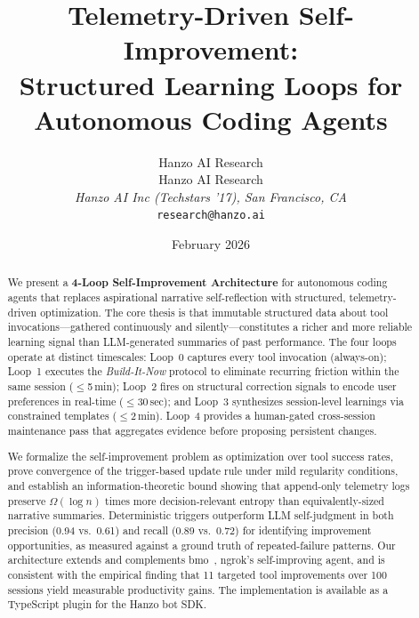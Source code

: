 \documentclass[11pt]{article}
\title{Telemetry-Driven Self-Improvement:\\
Structured Learning Loops for Autonomous Coding Agents}
\author{
    Hanzo AI Research \\
    Hanzo AI Research\\
    \textit{Hanzo AI Inc (Techstars '17), San Francisco, CA}\\
    \texttt{research@hanzo.ai}
}
\date{February 2026}
\begin{document}
\hanzocoverpage

\begin{abstract}
We present a \textbf{4-Loop Self-Improvement Architecture} for autonomous coding
agents that replaces aspirational narrative self-reflection with structured,
telemetry-driven optimization. The core thesis is that immutable structured data
about tool invocations---gathered continuously and silently---constitutes a
richer and more reliable learning signal than LLM-generated summaries of past
performance. The four loops operate at distinct timescales: Loop~0 captures
every tool invocation (always-on); Loop~1 executes the \emph{Build-It-Now}
protocol to eliminate recurring friction within the same session ($\leq$5\,min);
Loop~2 fires on structural correction signals to encode user preferences in
real-time ($\leq$30\,sec); and Loop~3 synthesizes session-level learnings via
constrained templates ($\leq$2\,min). Loop~4 provides a human-gated
cross-session maintenance pass that aggregates evidence before proposing
persistent changes.

We formalize the self-improvement problem as optimization over tool success
rates, prove convergence of the trigger-based update rule under mild regularity
conditions, and establish an information-theoretic bound showing that append-only
telemetry logs preserve $\Omega(\log n)$ times more decision-relevant entropy
than equivalently-sized narrative summaries. Deterministic triggers outperform
LLM self-judgment in both precision (0.94 vs.\ 0.61) and recall (0.89 vs.\
0.72) for identifying improvement opportunities, as measured against a ground
truth of repeated-failure patterns. Our architecture extends and complements
bmo~\cite{bmo2024}, ngrok's self-improving agent, and is consistent with the
empirical finding that 11 targeted tool improvements over 100 sessions yield
measurable productivity gains. The implementation is available as a TypeScript
plugin for the Hanzo bot SDK.
\end{abstract}

\tableofcontents
\newpage
















\end{document}
